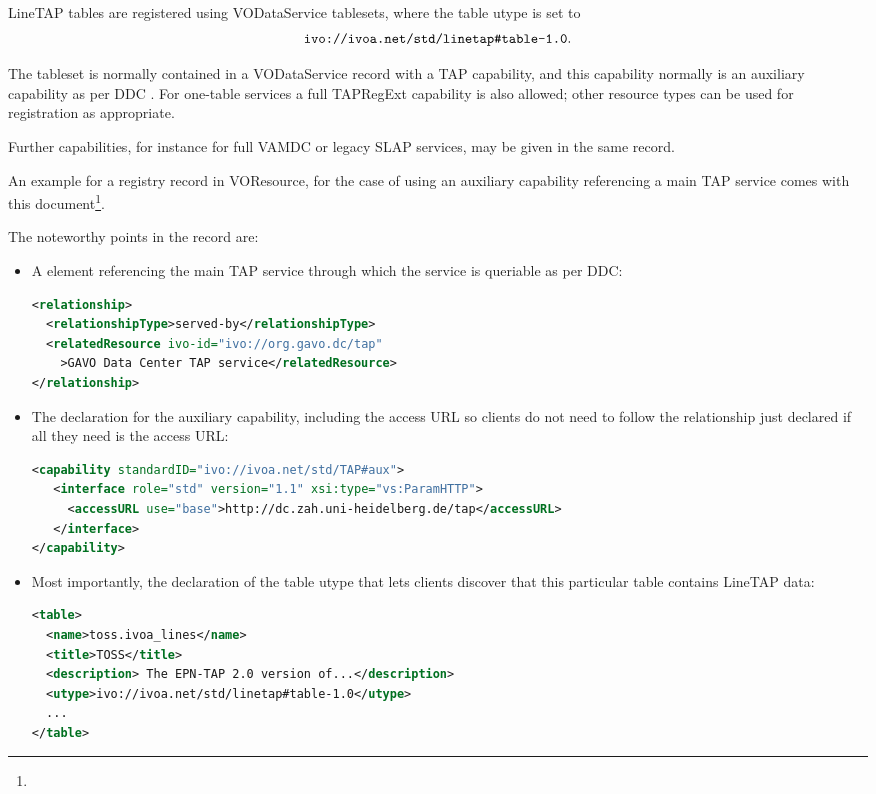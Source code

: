 \documentclass[11pt,a4paper]{ivoa}
\begin{document}
LineTAP tables are registered using VODataService
\citep{2010ivoa.spec.1202P} tablesets, where the table utype is set to
$$\hbox{\verb|ivo://ivoa.net/std/linetap#table-1.0|}.$$

The tableset is normally contained in a VODataService 
record with a TAP capability, and this capability normally is an auxiliary
capability as per DDC \citep{2019ivoa.spec.0520D}.  For one-table
services a full TAPRegExt \citep{2012ivoa.spec.0827D} capability is also
allowed; other resource types can be used for registration as
appropriate.

Further capabilities, for instance for full VAMDC or legacy SLAP
services, may be given in the same record.

An example for a registry record in VOResource, for the case of
using an auxiliary capability referencing a main TAP service comes with
this document\footnote{}.

The noteworthy points in the record are:

\begin{itemize}
\item A  element referencing the main TAP service
through which the service is queriable as per DDC:
\begin{lstlisting}[language=XML,basicstyle=\footnotesize]
<relationship>
  <relationshipType>served-by</relationshipType>
  <relatedResource ivo-id="ivo://org.gavo.dc/tap"
    >GAVO Data Center TAP service</relatedResource>
</relationship>
\end{lstlisting}

\item The declaration for the auxiliary capability, including the access
URL so clients do not need to follow the relationship just declared if
all they need is the access URL:
\begin{lstlisting}[language=XML,basicstyle=\footnotesize]
<capability standardID="ivo://ivoa.net/std/TAP#aux">
   <interface role="std" version="1.1" xsi:type="vs:ParamHTTP">
     <accessURL use="base">http://dc.zah.uni-heidelberg.de/tap</accessURL>
   </interface>
</capability>
\end{lstlisting}

\item Most importantly, the declaration of the table utype that lets
clients discover that this particular table contains LineTAP data:
\begin{lstlisting}[language=XML,basicstyle=\footnotesize]
<table>
  <name>toss.ivoa_lines</name>
  <title>TOSS</title>
  <description> The EPN-TAP 2.0 version of...</description>
  <utype>ivo://ivoa.net/std/linetap#table-1.0</utype>
  ...
</table>
\end{lstlisting}
\end{itemize}
\end{document}
